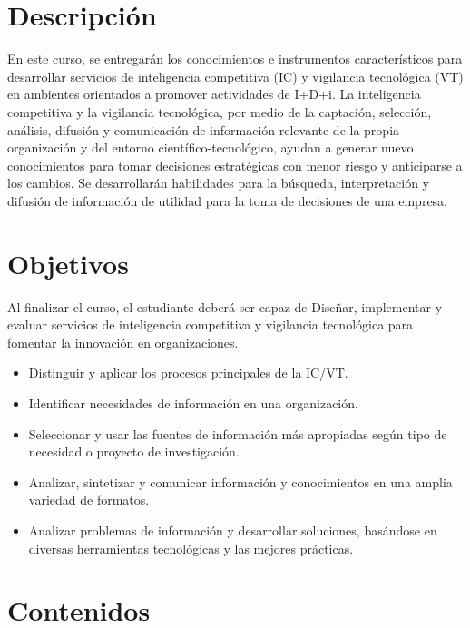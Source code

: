 \documentclass[11pt,letterpaper]{article}
\begin{document}
\section*{Descripción}
En este curso, se entregarán los conocimientos e instrumentos característicos para desarrollar servicios de inteligencia competitiva (IC) y vigilancia tecnológica (VT) en ambientes orientados a promover actividades de I+D+i. La inteligencia competitiva y la vigilancia tecnológica, por medio de la captación, selección, análisis, difusión y comunicación de información relevante de la propia organización y del entorno científico-tecnológico, ayudan a generar nuevo conocimientos para tomar decisiones estratégicas con menor riesgo y anticiparse a los cambios. Se desarrollarán habilidades para la búsqueda, interpretación y difusión de información de utilidad para la toma de decisiones de una empresa.

\section*{Objetivos}
Al finalizar el curso, el estudiante deberá ser capaz de Diseñar, implementar y evaluar servicios de inteligencia competitiva y vigilancia tecnológica para fomentar la innovación en organizaciones.

\begin{itemize}
  \item Distinguir y aplicar los procesos principales de la IC/VT.

  \item Identificar necesidades de información en una organización.

  \item Seleccionar y usar las fuentes de información más apropiadas según tipo de necesidad o proyecto de investigación.

  \item Analizar, sintetizar y comunicar información y conocimientos en una amplia variedad de formatos.

  \item Analizar problemas de información y desarrollar soluciones, basándose en diversas herramientas tecnológicas y las mejores prácticas.
\end{itemize}

\section*{Contenidos}
\end{document}
